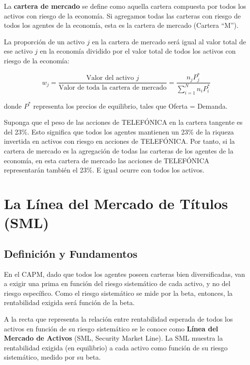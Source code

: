 \begin{definicion}
La \textbf{cartera de mercado} se define como aquella cartera compuesta por todos los activos con riesgo de la economía. Si agregamos todas las carteras con riesgo de todos los agentes de la economía, esta es la cartera de mercado (Cartera ``M'').
\end{definicion}

La proporción de un activo \(j\) en la cartera de mercado será igual al valor total de ese activo \(j\) en la economía dividido por el valor total de todos los activos con riesgo de la economía:

\begin{equation}
w_j = \frac{\text{Valor del activo } j}{\text{Valor de toda la cartera de mercado}} = \frac{n_j P_j^*}{\sum_{i=1}^{N} n_i P_i^*}
\end{equation}

donde $P^*$ representa los precios de equilibrio, tales que Oferta = Demanda.

\begin{ejemplo}
Suponga que el peso de las acciones de TELEFÓNICA en la cartera tangente es del 23\%. Esto significa que todos los agentes mantienen un 23\% de la riqueza invertida en activos con riesgo en acciones de TELEFÓNICA. Por tanto, si la cartera de mercado es la agregación de todas las carteras de los agentes de la economía, en esta cartera de mercado las acciones de TELEFÓNICA representarán también el 23\%. E igual ocurre con todos los activos.
\end{ejemplo}

\section{La Línea del Mercado de Títulos (SML)}

\subsection{Definición y Fundamentos}

En el CAPM, dado que todos los agentes poseen carteras bien diversificadas, van a exigir una prima en función del riesgo sistemático de cada activo, y no del riesgo específico. Como el riesgo sistemático se mide por la beta, entonces, la rentabilidad exigida será función de la beta.

\begin{definicion}
A la recta que representa la relación entre rentabilidad esperada de todos los activos en función de su riesgo sistemático se le conoce como \textbf{Línea del Mercado de Activos} (SML, Security Market Line). La SML muestra la rentabilidad exigida (en equilibrio) a cada activo como función de su riesgo sistemático, medido por su beta.
\end{definicion}

